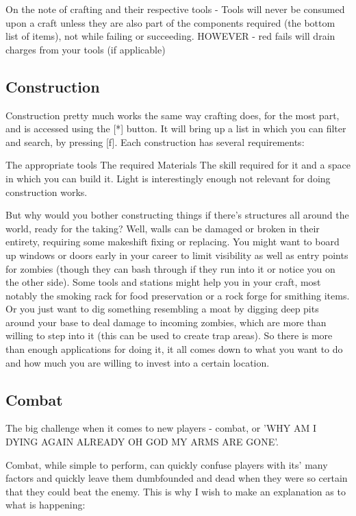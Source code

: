 \documentclass[11pt]{report}
\begin{document}
On the note of crafting and their respective tools - Tools will never be consumed upon a craft unless they are also part of the components required (the bottom list of items), not while failing or succeeding. HOWEVER - red fails will drain charges from your tools (if applicable)

\subsection{Construction}

Construction pretty much works the same way crafting does, for the most part, and is accessed using the [*] button. It will bring up a list in which you can filter and search, by pressing [f]. Each construction has several requirements:

The appropriate tools
The required Materials
The skill required for it
and a space in which you can build it.
Light is interestingly enough not relevant for doing construction works.

But why would you bother constructing things if there's structures all around the world, ready for the taking? Well, walls can be damaged or broken in their entirety, requiring some makeshift fixing or replacing. You might want to board up windows or doors early in your career to limit visibility as well as entry points for zombies (though they can bash through if they run into it or notice you on the other side). Some tools and stations might help you in your craft, most notably the smoking rack for food preservation or a rock forge for smithing items. Or you just want to dig something resembling a moat by digging deep pits around your base to deal damage to incoming zombies, which are more than willing to step into it (this can be used to create trap areas). So there is more than enough applications for doing it, it all comes down to what you want to do and how much you are willing to invest into a certain location.

\subsection{Combat}

The big challenge when it comes to new players - combat, or 'WHY AM I DYING AGAIN ALREADY OH GOD MY ARMS ARE GONE'.

Combat, while simple to perform, can quickly confuse players with its' many factors and quickly leave them dumbfounded and dead when they were so certain that they could beat the enemy. This is why I wish to make an explanation as to what is happening:
\end{document}
